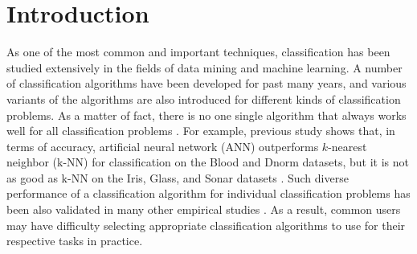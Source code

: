 \documentclass[prodmode,acmtkdd]{acmsmall}
\begin{document}
\maketitle





\section{Introduction}\label{sec:intro}


As one of the most common and important techniques, classification has been studied extensively in the fields of data mining and machine learning.
A number of classification algorithms have been developed for past many years,
and various variants of the algorithms are also introduced for different kinds of classification problems.
As a matter of fact, there is no one single algorithm that always works well for all classification problems \cite{song2012automatic}.
For example, previous study shows that, in terms of accuracy,
artificial neural network (ANN) outperforms $k$-nearest neighbor (k-NN) for classification on the Blood and Dnorm datasets,
but it is not as good as k-NN on the Iris, Glass, and Sonar datasets \cite{duin1996note}.
Such diverse performance of a classification algorithm for individual classification problems has been also validated in many other empirical studies \cite{brazdil2003ranking,Bensusan1998god,ali2006learning,smith2008cross,song2012automatic,prudencio2011selecting}.
As a result, common users may have difficulty selecting appropriate classification algorithms to use for their respective tasks in practice.



\end{document}
